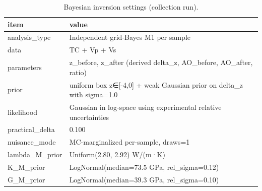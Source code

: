 \begin{table}[ht!]
\centering
\caption{Bayesian inversion settings (collection run).}
\label{tab:bayes\_m1\_settings}
\begin{tabular}{ll}
\toprule
\textbf{item} & \textbf{value} \\
\midrule
analysis\_type & Independent grid-Bayes M1 per sample \\
data & TC + Vp + Vs \\
parameters & z\_before, z\_after (derived delta\_z, AO\_before, AO\_after, ratio) \\
prior & uniform box z∈[-4,0] + weak Gaussian prior on delta\_z with sigma=1.0 \\
likelihood & Gaussian in log-space using experimental relative uncertainties \\
practical\_delta & 0.100 \\
nuisance\_mode & MC-marginalized per-sample, draws=1 \\
lambda\_M\_prior & Uniform(2.80, 2.92) W/(m·K) \\
K\_M\_prior & LogNormal(median=73.5 GPa, rel\_sigma=0.12) \\
G\_M\_prior & LogNormal(median=39.3 GPa, rel\_sigma=0.10) \\
\bottomrule
\end{tabular}
\end{table}
